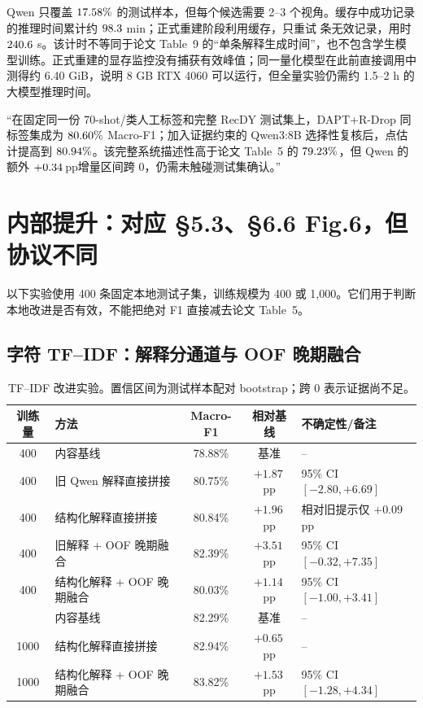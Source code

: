 \documentclass[UTF8,zihao=-4,a4paper]{ctexart}
\newcommand{\pp}{\,pp}
\begin{document}
Qwen 只覆盖 $17.58\%$ 的测试样本，但每个候选需要 2--3 个视角。缓存中成功记录的推理时间累计约 $98.3$ min；正式重建阶段利用缓存，只重试 \QwenGateNewRetryRecords 条无效记录，用时 $240.6$ s。该计时不等同于论文 Table~9 的“单条解释生成时间”，也不包含学生模型训练。正式重建的显存监控没有捕获有效峰值；同一量化模型在此前直接调用中测得约 6.40 GiB，说明 8 GB RTX 4060 可以运行，但全量实验仍需约 1.5--2 h 的大模型推理时间。

\begin{riskbox}[当前结论的准确写法]
“在固定同一份 70-shot/类人工标签和完整 RecDY 测试集上，DAPT+R-Drop 同标签集成为 $80.60\%$ Macro-F1；加入证据约束的 Qwen3:8B 选择性复核后，点估计提高到 $80.94\%$。该完整系统描述性高于论文 Table~5 的 $79.23\%$，但 Qwen 的额外 $+0.34$\pp 增量区间跨 0，仍需未触碰测试集确认。”
\end{riskbox}

\clearpage
\section{内部提升：对应 \S5.3、\S6.6 Fig.6，但协议不同}

\begin{infobox}[可比性等级：C]
以下实验使用 400 条固定本地测试子集，训练规模为 400 或 1,000。它们用于判断本地改进是否有效，不能把绝对 F1 直接减去论文 Table~5。
\end{infobox}

\subsection{字符 TF--IDF：解释分通道与 OOF 晚期融合}

\begin{table}[H]
\centering
\small
\caption{TF--IDF 改进实验。置信区间为测试样本配对 bootstrap；跨 0 表示证据尚不足。}
\label{tab:tfidf-improvement}
\begin{tabularx}{\textwidth}{c X c c X}
\toprule
训练量 & 方法 & Macro-F1 & 相对基线 & 不确定性/备注 \\
\midrule
400 & 内容基线 & 78.88\% & 基准 & -- \\
400 & 旧 Qwen 解释直接拼接 & 80.75\% & $+1.87$\pp & 95\% CI $[-2.80,+6.69]$ \\
400 & 结构化解释直接拼接 & 80.84\% & $+1.96$\pp & 相对旧提示仅 $+0.09$\pp \\
\rowcolor{LightGreen}400 & 旧解释 + OOF 晚期融合 & 82.39\% & $+3.51$\pp & 95\% CI $[-0.32,+7.35]$ \\
400 & 结构化解释 + OOF 晚期融合 & 80.03\% & $+1.14$\pp & 95\% CI $[-1.00,+3.41]$ \\
\addlinespace
1000 & 内容基线 & 82.29\% & 基准 & -- \\
1000 & 结构化解释直接拼接 & 82.94\% & $+0.65$\pp & -- \\
\rowcolor{LightGreen}1000 & 结构化解释 + OOF 晚期融合 & 83.82\% & $+1.53$\pp & 95\% CI $[-1.28,+4.34]$ \\
\bottomrule
\end{tabularx}
\end{table}
\end{document}
